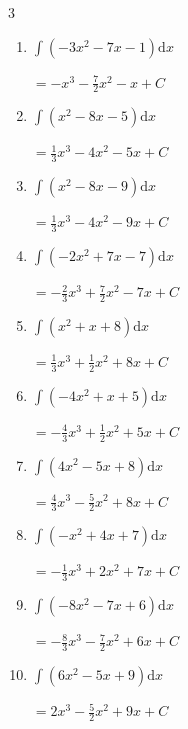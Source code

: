 \begin{multicols}{3}
\begin{enumerate}
  \item $\displaystyle \int \left( -3x^{2}-7x-1 \right) \mathrm{d}x$

        $\displaystyle =-x^{3}-\frac{7}{2}x^{2}-x+ C$

  \item $\displaystyle \int \left( x^{2}-8x-5 \right) \mathrm{d}x$

        $\displaystyle =\frac{1}{3}x^{3}-4x^{2}-5x+ C$

  \item $\displaystyle \int \left( x^{2}-8x-9 \right) \mathrm{d}x$

        $\displaystyle =\frac{1}{3}x^{3}-4x^{2}-9x+ C$

\columnbreak %

\resetques

  \item $\displaystyle \int \left( -2x^{2}+7x-7 \right) \mathrm{d}x$

        $\displaystyle =-\frac{2}{3}x^{3}+\frac{7}{2}x^{2}-7x+ C$

  \item $\displaystyle \int \left( x^{2}+x+8 \right) \mathrm{d}x$

        $\displaystyle =\frac{1}{3}x^{3}+\frac{1}{2}x^{2}+8x+ C$

  \item $\displaystyle \int \left( -4x^{2}+x+5 \right) \mathrm{d}x$

        $\displaystyle =-\frac{4}{3}x^{3}+\frac{1}{2}x^{2}+5x+ C$

  \item $\displaystyle \int \left( 4x^{2}-5x+8 \right) \mathrm{d}x$

        $\displaystyle =\frac{4}{3}x^{3}-\frac{5}{2}x^{2}+8x+ C$

  \item $\displaystyle \int \left( -x^{2}+4x+7 \right) \mathrm{d}x$

        $\displaystyle =-\frac{1}{3}x^{3}+2x^{2}+7x+ C$

  \item $\displaystyle \int \left( -8x^{2}-7x+6 \right) \mathrm{d}x$

        $\displaystyle =-\frac{8}{3}x^{3}-\frac{7}{2}x^{2}+6x+ C$

  \item $\displaystyle \int \left( 6x^{2}-5x+9 \right) \mathrm{d}x$

        $\displaystyle =2x^{3}-\frac{5}{2}x^{2}+9x+ C$


\end{enumerate}
\end{multicols}
